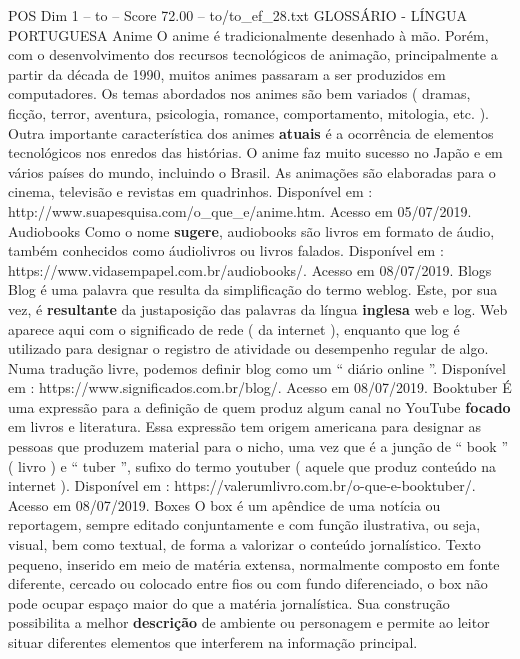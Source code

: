 \begin{textsample}{POS Dim 1 – to – Score 72.00 – to/to\_ef\_28.txt}  \label{ex:f1_pos_251}
GLOSSÁRIO - LÍNGUA PORTUGUESA Anime O anime é tradicionalmente desenhado à mão.
Porém, com o desenvolvimento dos recursos tecnológicos de animação, principalmente a partir da década de 1990, muitos animes passaram a ser produzidos em computadores.
Os temas abordados nos animes são bem variados ( dramas, ficção, terror, aventura, psicologia, romance, comportamento, mitologia, etc. ).
Outra importante característica dos animes \textbf{atuais} é a ocorrência de elementos tecnológicos nos enredos das histórias.
O anime faz muito sucesso no Japão e em vários países do mundo, incluindo o Brasil.
As animações são elaboradas para o cinema, televisão e revistas em quadrinhos.
Disponível em : http://www.suapesquisa.com/o\_que\_e/anime.htm.
Acesso em 05/07/2019.
Audiobooks Como o nome \textbf{sugere}, audiobooks são livros em formato de áudio, também conhecidos como áudiolivros ou livros falados.
Disponível em : https://www.vidasempapel.com.br/audiobooks/.
Acesso em 08/07/2019.
Blogs Blog é uma palavra que resulta da simplificação do termo weblog.
Este, por sua vez, é \textbf{resultante} da justaposição das palavras da língua \textbf{inglesa} web e log.
Web aparece aqui com o significado de rede ( da internet ), enquanto que log é utilizado para designar o registro de atividade ou desempenho regular de algo.
Numa tradução livre, podemos definir blog como um “ diário online ”.
Disponível em : https://www.significados.com.br/blog/.
Acesso em 08/07/2019.
Booktuber É uma expressão para a definição de quem produz algum canal no YouTube \textbf{focado} em livros e literatura.
Essa expressão tem origem americana para designar as pessoas que produzem material para o nicho, uma vez que é a junção de “ book ” ( livro ) e “ tuber ”, sufixo do termo youtuber ( aquele que produz conteúdo na internet ).
Disponível em : https://valerumlivro.com.br/o-que-e-booktuber/.
Acesso em 08/07/2019.
Boxes O box é um apêndice de uma notícia ou reportagem, sempre editado conjuntamente e com função ilustrativa, ou seja, visual, bem como textual, de forma a valorizar o conteúdo jornalístico.
Texto pequeno, inserido em meio de matéria extensa, normalmente composto em fonte diferente, cercado ou colocado entre fios ou com fundo diferenciado, o box não pode ocupar espaço maior do que a matéria jornalística.
Sua construção possibilita a melhor \textbf{descrição} de ambiente ou personagem e permite ao leitor situar diferentes elementos que interferem na informação principal.

\end{textsample}
